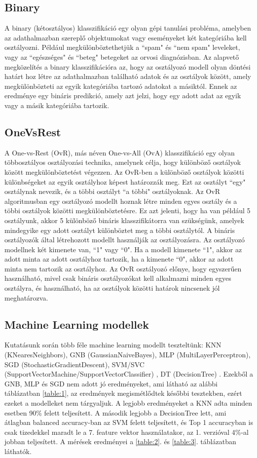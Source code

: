 \documentclass[12pt,a4paper]{article}
\begin{document}
\subsection{Binary}
A binary (kétosztályos) klasszifikáció egy olyan gépi tanulási probléma, amelyben az adathalmazban szereplő objektumokat vagy eseményeket két kategóriába kell osztályozni. Például megkülönböztethetjük a ``spam" és ``nem spam" leveleket, vagy az ``egészséges" és ``beteg" betegeket az orvosi diagnózisban.
Az alapvető megközelítés a binary klasszifikációra az, hogy az osztályozó modell olyan döntési határt hoz létre az adathalmazban található adatok és az osztályok között, amely megkülönbözteti az egyik kategóriába tartozó adatokat a másiktól. Ennek az eredménye egy bináris predikció, amely azt jelzi, hogy egy adott adat az egyik vagy a másik kategóriába tartozik.
\subsection{OneVsRest}
A One-vs-Rest (OvR), más néven One-vs-All (OvA) klasszifikáció egy olyan többosztályos osztályozási technika, amelynek célja, hogy különböző osztályok között megkülönböztetést végezzen. Az OvR-ben a különböző osztályok közötti különbségeket az egyik osztályhoz képest határozzák meg. Ezt az osztályt ``egy" osztálynak nevezik, és a többi osztályt ``a többi" osztályoknak.
Az OvR algoritmusban egy osztályozó modellt hoznak létre minden egyes osztály és a többi osztályok közötti megkülönböztetésre. Ez azt jelenti, hogy ha van például 5 osztályunk, akkor 5 különböző bináris klasszifikátorra van szükségünk, amelyek mindegyike egy adott osztályt különböztet meg a többi osztálytól.
A bináris osztályozók által létrehozott modellt használják az osztályozásra. Az osztályozó modellnek két kimenete van, ``1" vagy ``0". Ha a modell kimenete ``1", akkor az adott minta az adott osztályhoz tartozik, ha a kimenete ``0", akkor az adott minta nem tartozik az osztályhoz.
Az OvR osztályozó előnye, hogy egyszerűen használható, mivel csak bináris osztályozókat kell alkalmazni minden egyes osztályra, és használható, ha az osztályok közötti határok nincsenek jól meghatározva.
\subsection{Machine Learning modellek}
Kutatásunk során több féle machine learning modellt teszteltünk: KNN (KNearesNeighbors), GNB (GaussianNaiveBayes), MLP (MultiLayerPerceptron),
SGD (StochasticGradientDescent), SVM/SVC (SupportVectorMachine/SupportVectorClassifier) \cite{CC01a}, DT (DecisionTree) \cite{Breiman1984ClassificationAR}.
Ezekből a GNB, MLP és SGD nem adott jó eredményeket, ami látható az alábbi táblázatban \ref{table:1}, az eredmények megismétlődtek későbbi tesztekben, ezért
ezeket a modelleket nem tárgyaljuk. A legjobb eredményeket a KNN adta minden esetben 90\% felett teljesített. A második legjobb a DecisionTree lett, ami átlagban
balanced accuracy-ban az SVM felett teljesített, és Top 1 accuracyban is csak tizedekkel maradt le a 7. feature vektor használatakor, az 1. verzióval 4\%-al
jobban teljesített. A mérések eredményei a \ref{table:2}. és \ref{table:3}. táblázatban láthatók.
\end{document}
